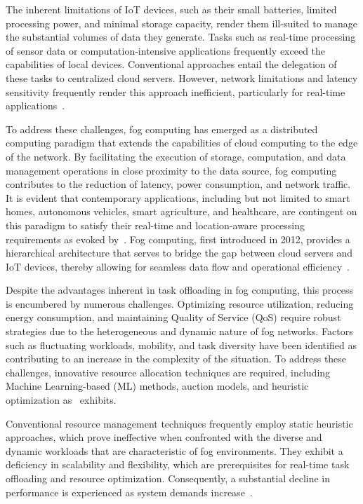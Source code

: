 \documentclass{svproc}
\begin{document}
The inherent limitations of IoT devices, such as their small batteries, limited processing power, and minimal storage capacity, render them ill-suited to manage the substantial volumes of data they generate. Tasks such as real-time processing of sensor data or computation-intensive applications frequently exceed the capabilities of local devices. Conventional approaches entail the delegation of these tasks to centralized cloud servers. However, network limitations and latency sensitivity frequently render this approach inefficient, particularly for real-time applications~\cite{benaboura_comprehensive_nodate}.

To address these challenges, fog computing has emerged as a distributed computing paradigm that extends the capabilities of cloud computing to the edge of the network. By facilitating the execution of storage, computation, and data management operations in close proximity to the data source, fog computing contributes to the reduction of latency, power consumption, and network traffic. It is evident that contemporary applications, including but not limited to smart homes, autonomous vehicles, smart agriculture, and healthcare, are contingent on this paradigm to satisfy their real-time and location-aware processing requirements as evoked by~\cite{das_review_2023}. Fog computing, first introduced in 2012, provides a hierarchical architecture that serves to bridge the gap between cloud servers and IoT devices, thereby allowing for seamless data flow and operational efficiency~\cite{fahimullah_review_2022}.

Despite the advantages inherent in task offloading in fog computing, this process is encumbered by numerous challenges. Optimizing resource utilization, reducing energy consumption, and maintaining Quality of Service (QoS) require robust strategies due to the heterogeneous and dynamic nature of fog networks. Factors such as fluctuating workloads, mobility, and task diversity have been identified as contributing to an increase in the complexity of the situation. To address these challenges, innovative resource allocation techniques are required, including Machine Learning-based (ML) methods, auction models, and heuristic optimization as~\cite{fahimullah_review_2022} exhibits.

Conventional resource management techniques frequently employ static heuristic approaches, which prove ineffective when confronted with the diverse and dynamic workloads that are characteristic of fog environments. They exhibit a deficiency in scalability and flexibility, which are prerequisites for real-time task offloading and resource optimization. Consequently, a substantial decline in performance is experienced as system demands increase~\cite{iftikhar_ai-based_2023}.
\end{document}
